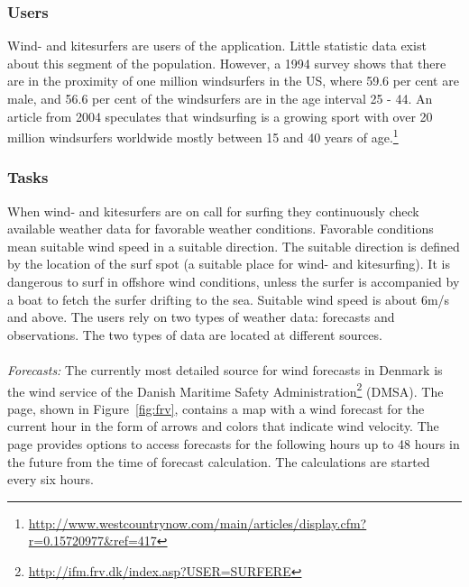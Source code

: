 \subsubsection{Users}\label{sec:user_and_task}
Wind- and kitesurfers are users of the application. Little statistic data exist
about this segment of the population. However, a 1994 survey \citep[p.27]{survey:windsurfers}
shows that there are in the proximity of one million windsurfers in the US, where
59.6 per cent are male, and 56.6 per cent of the windsurfers are in the age
interval 25 - 44. An article from
2004 speculates that windsurfing is a growing sport with over 20 million windsurfers
worldwide mostly between 15 and 40 years of age.\footnote{\url{http://www.westcountrynow.com/main/articles/display.cfm?r=0.15720977&ref=417}}

\subsubsection{Tasks}
When wind- and kitesurfers are on call for surfing they continuously check
available weather data for favorable weather conditions. Favorable conditions
mean suitable wind speed in a suitable direction. The suitable direction is
defined by the location of the surf spot (a suitable place for wind- and
kitesurfing). It is dangerous to surf in offshore wind conditions, unless the
surfer is accompanied by a boat to fetch the surfer drifting to the sea. Suitable
wind speed is about 6m/s and above. The users rely on two types of weather data:
forecasts and observations. The two types of data are located at different
sources. \\\\ \textit{Forecasts:} The currently most detailed source for wind
forecasts in Denmark is the wind service of the Danish Maritime Safety
Administration\footnote{\url{http://ifm.frv.dk/index.asp?USER=SURFERE}}
(DMSA). The page, shown in Figure~\ref{fig:frv}, contains a map with a wind
forecast for the current hour in the form of arrows and colors that indicate wind
velocity. The page provides options to access forecasts for the following hours
up to 48 hours in the future from the time of forecast calculation. The
calculations are started every six hours.


